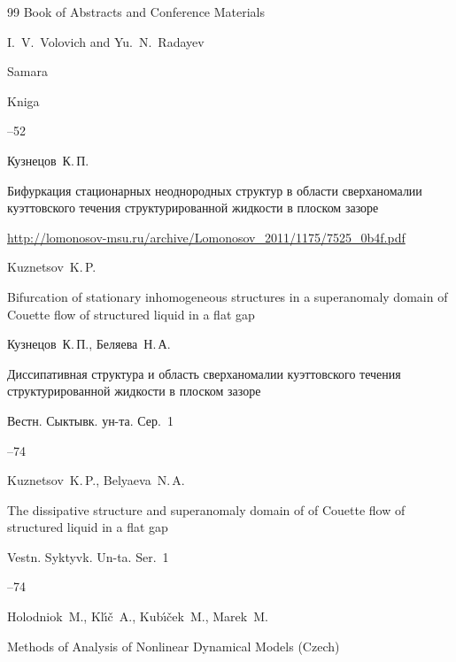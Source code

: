 \begin{thebibliography}{99}
\bookinfo Book of Abstracts and Conference Materials

\eds I.~V.~Volovich and Yu.~N.~Radayev

\publaddr Samara

\publ Kniga 


--52








\by Кузнецов~К.\,П.

\eprint Бифуркация стационарных неоднородных структур в области сверханомалии куэттовского течения структурированной жидкости в плоском зазоре

\eprintinfo \url{http://lomonosov-msu.ru/archive/Lomonosov_2011/1175/7525_0b4f.pdf}

\misctransl 

\by Kuznetsov~K.\,P.

\eprint Bifurcation of stationary inhomogeneous structures in a superanomaly domain of Couette flow of structured liquid in a flat gap




\by Кузнецов~К.\,П., Беляева~Н.\,А.

\paper Диссипативная структура и область сверханомалии куэттовского течения структурированной жидкости в плоском зазоре

\jour Вестн. Сыктывк.  ун-та. Сер.~1



--74

\misctransl

\by Kuznetsov~K.\,P., Belyaeva~N.\,A.

\paper The dissipative structure and  superanomaly domain of of Couette flow of structured liquid in a flat gap

\jour Vestn. Syktyvk. Un-ta. Ser.~1



--74




\by Holodniok~M., Kl\'{\i}\v{c}~A., Kub\'{\i}\v{c}ek~M., Marek~M.

\book Methods of Analysis of Nonlinear Dynamical Models (Czech)


\end{thebibliography}
